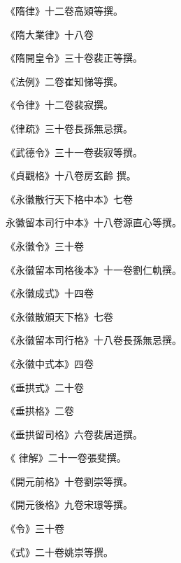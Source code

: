 \begin{pinyinscope}
 《隋律》十二卷高熲等撰。



 《隋大業律》十八卷



 《隋開皇令》三十卷裴正等撰。



 《法例》二卷崔知悌等撰。



 《令律》十二卷裴寂撰。



 《律疏》三十卷長孫無忌撰。



 《武德令》三十一卷裴寂等撰。



 《貞觀格》十八卷房玄齡
 撰。



 《永徽散行天下格中本》七卷



 永徽留本司行中本》十八卷源直心等撰。



 《永徽令》三十卷



 《永徽留本司格後本》十一卷劉仁軌撰。



 《永徽成式》十四卷



 《永徽散頒天下格》七卷



 《永徽留本司行格》十八卷長孫無忌撰。



 《永徽中式本》四卷



 《垂拱式》二十卷



 《垂拱格》二卷



 《垂拱留司格》六卷裴居道撰。



 《
 律解》二十一卷張斐撰。



 《開元前格》十卷劉崇等撰。



 《開元後格》九卷宋璟等撰。



 《令》三十卷



 《式》二十卷姚崇等撰。




\end{pinyinscope}
